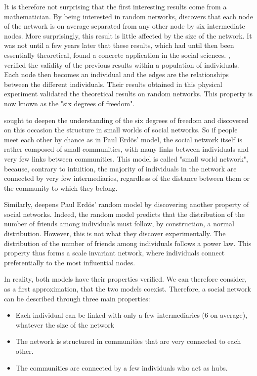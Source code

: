 It is therefore not surprising that the first interesting results come from a mathematician.
By being interested in random networks, \textcite{erdosEvolutionRandomGraphs1960} discovers that each node of the network is on average separated from any other node by six intermediate nodes.
More surprisingly, this result is little affected by the size of the network.
It was not until a few years later that these results, which had until then been essentially theoretical, found a concrete application in the social sciences.
\textcite{milgramSmallWorldProblem1967}, verified the validity of the previous results within a population of individuals.
Each node then becomes an individual and the edges are the relationships between the different individuals.
Their results obtained in this physical experiment validated the theoretical results on random networks.
This property is now known as the "six degrees of freedom".

\textcite{wattsCollectiveDynamicsSmallworld1998} sought to deepen the understanding of the six degrees of freedom and discovered on this occasion the structure in small worlds of social networks.
So if people meet each other by chance as in Paul Erdös' model, the social network itself is rather composed of small communities, with many links between individuals
and very few links between communities.
This model is called "small world network", because, contrary to intuition, the majority of individuals in the network are connected by very few intermediaries, regardless of the distance between them or the community to which they belong.

Similarly, \textcite{barabasiEmergenceScalingRandom1999} deepens Paul Erdös' random model by discovering another property of social networks.
Indeed, the random model predicts that the distribution of the number of friends among individuals must follow, by construction, a normal distribution.
However, this is not what they discover experimentally.
The distribution of the number of friends among individuals follows a power law.
This property thus forms a scale invariant network, where individuals connect preferentially to the most influential nodes.

In reality, both models have their properties verified.
We can therefore consider, as a first approximation, that the two models coexist.
Therefore, a social network can be described through three main properties:

\begin{itemize}
    \item Each individual can be linked with only a few intermediaries (6 on average), whatever the size of the network
    \item The network is structured in communities that are very connected to each other.
    \item The communities are connected by a few individuals who act as hubs.
\end{itemize}

